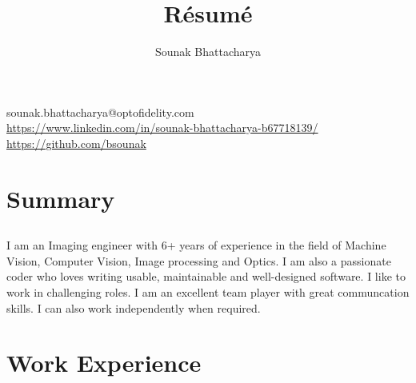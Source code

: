 \documentclass{article}
\renewcommand{\maketitle}{
\begin{center}
{\huge\bfseries
\theauthor}

\end{center}
}
\begin{document}
\title{R\'esum\'e}
\author{Sounak Bhattacharya}

\maketitle

\begin{center}
{\Large sounak.bhattacharya@optofidelity.com}\\
\url{https://www.linkedin.com/in/sounak-bhattacharya-b67718139/}\\
\url{https://github.com/bsounak} 
\end{center}

\section{Summary}
\subsection{}
I am an Imaging engineer with 6+ years of experience in the field of Machine
Vision, Computer Vision, Image processing and Optics. I am also a passionate
coder who loves writing usable, maintainable and well-designed software. I like
to work in challenging roles. I am an excellent team player with great
communcation skills. I can also work independently when required.
\subsection{}

\section{Work Experience}
\end{document}
